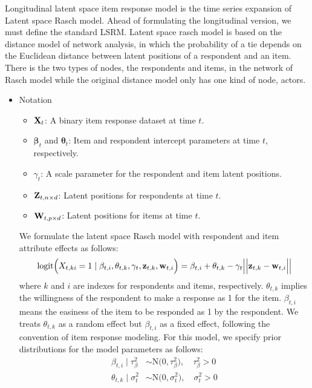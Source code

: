 \documentclass[a4paper, 11pt]{report}
\begin{document}
Longitudinal latent space item response model is the time series expansion of Latent space Rasch model. Ahead of formulating the longitudinal version, we must define the standard LSRM. Latent space rasch model is based on the distance model of network analysis, in which the probability of a tie depends on the Euclidean distance between latent positions of a respondent and an item. There is the two types of nodes, the respondents and items, in the network of Rasch model while the original distance model only has one kind of node, actors.
\begin{itemize}
\item Notation
\begin{itemize}
    \item ${\bf X}_t$: A binary item response dataset at time $t$.
    \item $\boldsymbol\beta_t$ and $\boldsymbol\theta_t$: Item and respondent intercept parameters at time $t$, respectively.
    \item $\gamma_t$: A scale parameter for the respondent and item latent positions.
    \item ${\bf Z}_{t,n \times d}$: Latent positions for respondents at time $t$.
    \item ${\bf W}_{t,p \times d}$: Latent positions for items at time $t$.
\end{itemize}
We formulate the latent space Rasch model with respondent and item attribute effects as follows:
\begin{equation}
\label{lsrm}
    \mbox{logit}\Big(X_{t,ki} = 1 \mid \beta_{t,i}, \theta_{t,k}, \gamma_t, {\bf z}_{t,k}, {\bf w}_{t,i}\Big)
    = \beta_{t,i} + \theta_{t,k} - \gamma_t \Big|\Big|{\bf z}_{t,k} - {\bf w}_{t,i}\Big|\Big|
\end{equation}
where $k$ and $i$ are indexes for respondents and items, respectively. $\theta_{t,k}$ implies the willingness of the respondent to make a response as 1 for the item. $\beta_{t,i}$ means the easiness of the item to be responded as 1 by the respondent. We treats $\theta_{t,k}$ as a random effect but $\beta_{t,i}$ as a fixed effect, following the convention of item response modeling. For this model, we specify prior distributions for the model parameters as follows:
\[\begin{split}
    \beta_{t,i} \mid \tau_{\beta}^2 &\sim \mbox{N}\big(0, \tau_{\beta}^2\big), \quad \tau_{\beta}^2 > 0 \\
    \theta_{t,k} \mid \sigma_t^2 &\sim \mbox{N}\big(0, \sigma_t^2\big), \quad \sigma_t^2 > 0 \\

\end{split}\]
\end{itemize}
\end{document}
